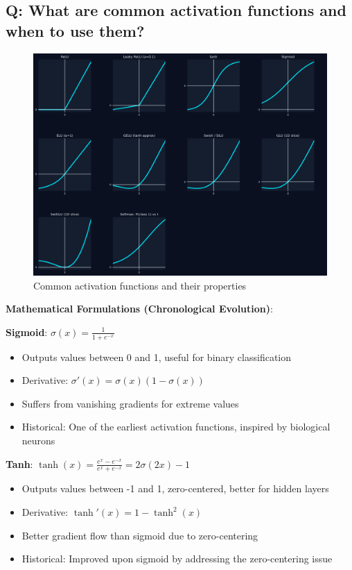 \subsection*{\textcolor{primaryteal}{Q: What are common activation functions and when to use them?}}
\begin{figure}[H]
	\centering
	\includegraphics[width=1\textwidth]{images/activation.png}
	\caption{Common activation functions and their properties}
\end{figure}

\textbf{Mathematical Formulations (Chronological Evolution)}:

\textbf{Sigmoid}: $\sigma(x) = \frac{1}{1 + e^{-x}}$
\begin{itemize}
	\item Outputs values between 0 and 1, useful for binary classification
	\item Derivative: $\sigma'(x) = \sigma(x)(1 - \sigma(x))$
	\item Suffers from vanishing gradients for extreme values
	\item Historical: One of the earliest activation functions, inspired by biological neurons
\end{itemize}

\textbf{Tanh}: $\tanh(x) = \frac{e^x - e^{-x}}{e^x + e^{-x}} = 2\sigma(2x) - 1$
\begin{itemize}
	\item Outputs values between -1 and 1, zero-centered, better for hidden layers
	\item Derivative: $\tanh'(x) = 1 - \tanh^2(x)$
	\item Better gradient flow than sigmoid due to zero-centering
	\item Historical: Improved upon sigmoid by addressing the zero-centering issue
\end{itemize}

